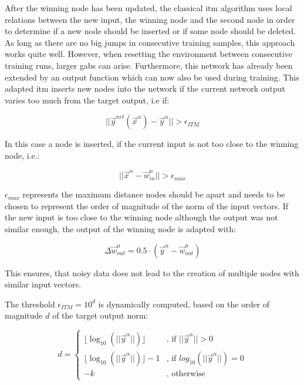 After the winning node has been updated, the classical \gls{itm} algorithm uses local relations between the new input, the winning node and the second node in order to determine if a new node should be inserted or if some node should be deleted. As long as there are no big jumps in consecutive training samples, this approach works quite well. However, when resetting the environment between consecutive training runs, larger gabs can arise. Furthermore, this network has already been extended by an output function which can now also be used during training. This adapted \gls{itm} inserts new nodes into the network if the current network output varies too much from the target output, i.e if:

\begin{equation}
||\vec{y}^{net}(\vec{x}^\alpha)-\vec{y}^\alpha|| > \epsilon_{ITM}
\end{equation}

In this case a node is inserted, if the current input is not too close to the winning node, i.e.:

\begin{equation}
||\vec{x}^\alpha - \vec{w}^n_{in}|| > \epsilon_{max}
\end{equation}

$\epsilon_{max}$ represents the maximum distance nodes should be apart and needs to be chosen to represent the order of magnitude of the norm of the input vectors.
If the new input is too close to the winning node although the output was not similar enough, the output of the winning node is adapted with:

\begin{equation}
\Delta\vec{w}^n_{out} = 0.5 \cdot (\vec{y}^\alpha - \vec{w}^n_{out})
\end{equation}

This ensures, that noisy data does not lead to the creation of multiple nodes with similar input vectors. 

The threshold $\epsilon_{ITM} = 10^d$ is dynamically computed, based on the order of magnitude $d$ of the target output norm:

\begin{equation}
d = \begin{cases}
\lfloor\log_{10}(||\vec{y}^\alpha||)\rfloor & \text{, if $||\vec{y}^\alpha|| > 0$} \\
\lfloor\log_{10}(||\vec{y}^\alpha||)\rfloor-1 & \text{, if $log_{10}(||\vec{y}^\alpha||) = 0$} \\
-k & \text{, otherwise}
\end{cases}
\end{equation}

